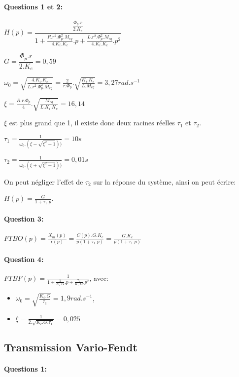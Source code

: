 \paragraph{Questions 1 et 2:} 

$H(p)=\dfrac{\frac{\Phi_p.r}{2.K_e}}{1+\frac{R.r^2.\Phi_p^2.M_{eq}}{4.K_i.K_e}.p+\frac{L.r^2.\Phi_p^2.M_{eq}}{4.K_i.K_e}.p^2}$

$G=\dfrac{\Phi_p.r}{2.K_e}=0,59$

$\omega_0=\sqrt{\frac{4.K_i.K_e}{L.r^2.\Phi_p^2.M_{eq}}}=\frac{2}{r.\Phi_p}.\sqrt{\frac{K_i.K_e}{L.M_{eq}}}=3,27rad.s^{-1}$

$\xi=\frac{R.r.\Phi_p}{4}.\sqrt{\frac{M_{eq}}{L.K_i.K_e}}=16,14$

$\xi$ est plus grand que 1, il existe donc deux racines réelles $\tau_1$ et $\tau_2$.

$\tau_1=\frac{1}{\omega_0.(\xi-\sqrt{\xi^2-1}))}=10s$

$\tau_2=\frac{1}{\omega_0.(\xi+\sqrt{\xi^2-1}))}=0,01s$

On peut négliger l'effet de $\tau_2$ sur la réponse du système, ainsi on peut écrire:

$H(p)=\frac{G}{1+\tau_1.p}$.

\paragraph{Question 3:}

$FTBO(p)=\frac{X_m(p)}{\epsilon (p)}=\frac{C(p).G.K_c}{p(1+\tau_1.p)}=\frac{G.K_c}{p(1+\tau_1.p)}$

\paragraph{Question 4:}

$FTBF(p)=\frac{1}{1+\frac{1}{K_c.G}.p+\frac{\tau_1}{K_c.G}.p^2}$, avec:

\begin{itemize}
 \item $\omega_0=\sqrt{\frac{K_c.G}{\tau_1}}=1,9rad.s^{-1}$,
 \item $\xi=\frac{1}{2.\sqrt{K_c.G.\tau_1}}=0,025$
\end{itemize}

\subsection{Transmission Vario-Fendt}

\paragraph{Questions 1:}

